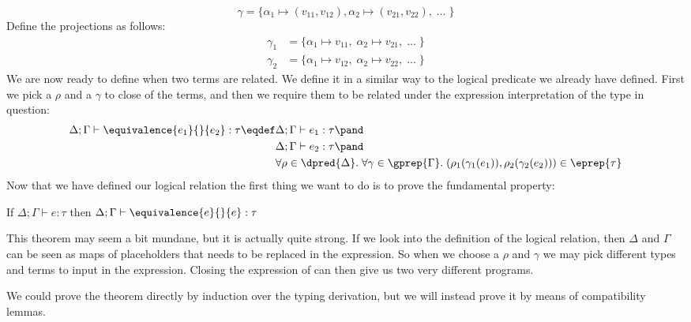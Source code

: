 \[
  \gamma = \{\alpha_1 \mapsto (v_{11},v_{12}), \alpha_2 \mapsto (v_{21},v_{22}),\; \dots\; \}
\]
Define the projections as follows:
\begin{align*}
  \gamma_1 & = \{\alpha_1 \mapsto v_{11}, \; \alpha_2 \mapsto v_{21},\; \dots \;\} \\
  \gamma_2 & = \{\alpha_1 \mapsto v_{12}, \; \alpha_2 \mapsto v_{22},\; \dots \;\}
\end{align*}
We are now ready to define when two terms are related. We define it in a similar way to the logical predicate we already have defined. First we pick a $\rho$ and a $\gamma$ to close of the terms, and then we require them to be related under the expression interpretation of the type in question:
\renewcommand{\lreq}[2]{\equivalence{#1}{}{#2}}
\begin{align*}
  \Delta ; \Gamma \vdash \lreq{e_1}{e_2} : \tau \eqdef & \Delta ; \Gamma \vdash e_1 : \tau \pand\\
                                                      & \Delta ; \Gamma \vdash e_2 : \tau \pand \\
                                                      & \forall \rho \in \dpred{\Delta}. \; \forall \gamma \in \gprep{\Gamma}. \; (\rho_1(\gamma_1(e_1)),\rho_2(\gamma_2(e_2))) \in \eprep{\tau}
\end{align*}
Now that we have defined our logical relation the first thing we want to do is to prove the fundamental property:
\begin{fundamentalprop}
  If $\Delta; \Gamma \vdash e : \tau$ then $\Delta; \Gamma \vdash \lreq{e}{e} : \tau$
\end{fundamentalprop}
This theorem may seem a bit mundane, but it is actually quite strong. If we look into the definition of the logical relation, then $\Delta$ and $\Gamma$ can be seen as maps of placeholders that needs to be replaced in the expression. So when we choose a $\rho$ and $\gamma$ we may pick different types and terms to input in the expression. Closing the expression of can then give us two very different programs. 

We could prove the theorem directly by induction over the typing derivation, but we will instead prove it by means of compatibility lemmas.
